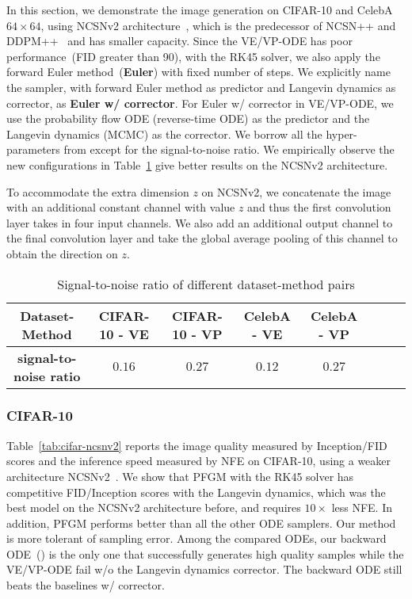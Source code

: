 In this section, we demonstrate the image generation on CIFAR-10 and CelebA $64 \times 64$, using NCSNv2 architecture~\cite{Song2020ImprovedTF}, which is the predecessor of NCSN++ and DDPM++~\cite{Song2021ScoreBasedGM} and has smaller capacity. Since the VE/VP-ODE has poor performance~(FID greater than 90), with the RK45 solver, we also apply the forward Euler method~(\textbf{Euler}) with fixed number of steps. We explicitly name the sampler, with forward Euler method as predictor and Langevin dynamics as corrector, as \textbf{Euler w/ corrector}. For Euler w/ corrector in VE/VP-ODE, we use the probability flow ODE (reverse-time ODE) as the predictor and the Langevin dynamics (MCMC) as the corrector. We borrow all the hyper-parameters from \cite{Song2021ScoreBasedGM} except for the signal-to-noise ratio. We empirically observe the new configurations in Table~\ref{table:s2n} give better results on the NCSNv2 architecture.

To accommodate the extra dimension $z$ on NCSNv2, we concatenate the image with an additional constant channel with value $z$ and thus the first convolution layer takes in four input channels. We also add an additional output channel to the final convolution layer and take the global average pooling of this channel to obtain the direction on $z$.

\begin{table}[htbp]
\begin{center}
\caption{Signal-to-noise ratio of different dataset-method pairs}
\label{table:s2n}
\begin{tabular}{c c c c c c c c}
		\toprule
		\textbf{Dataset-Method} &  CIFAR-10 - VE &CIFAR-10 - VP & CelebA - VE & CelebA - VP\\
		\midrule
        \textbf{signal-to-noise ratio} &  $0.16$ &$0.27$  &$0.12$ & $0.27$ \\
        \bottomrule
\end{tabular}
\end{center}
\end{table}

\label{app:ncsnv2}
\subsubsection{CIFAR-10}

Table~\ref{tab:cifar-ncsnv2} reports the image quality measured by Inception/FID scores and the inference speed measured by NFE on CIFAR-10, using a weaker architecture NCSNv2~\cite{Song2020ImprovedTF}. We show that PFGM with the RK45 solver has competitive FID/Inception scores with the Langevin dynamics, which was the best model on the NCSNv2 architecture before, and requires $10\times$ less NFE. In addition, PFGM performs better than all the other ODE samplers. Our method is more tolerant of sampling error. Among the compared ODEs, our backward ODE~() is the only one that successfully generates high quality samples while the VE/VP-ODE fail w/o the Langevin dynamics corrector. The backward ODE still beats the baselines w/ corrector. 


